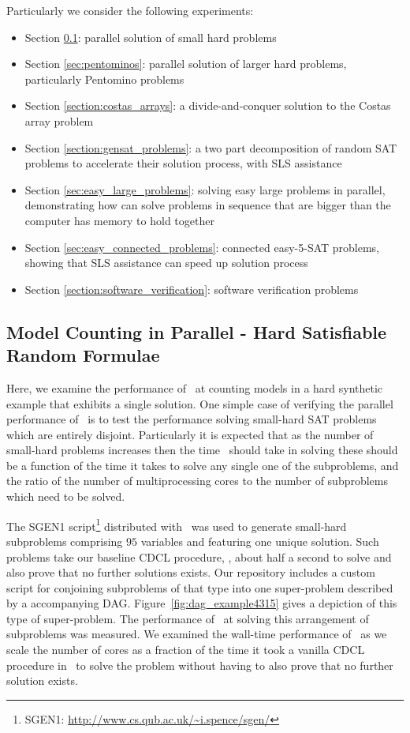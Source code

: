 \documentclass[
10pt, %
a4paper, %
oneside, %
headinclude,footinclude, %
BCOR5mm, %
]{scrartcl}
\begin{document}
Particularly we consider the following experiments:

\begin{itemize}
\item	Section \ref{section:section1}: parallel solution of small hard problems
\item	Section \ref{sec:pentominos}: parallel solution of larger hard problems, particularly Pentomino problems
\item	Section \ref{section:costas_arrays}: a divide-and-conquer solution to the Costas array problem
\item	Section \ref{section:gensat_problems}: a two part decomposition of random SAT problems to accelerate their solution process, with SLS assistance
\item	Section \ref{sec:easy_large_problems}: solving easy large problems in parallel, demonstrating how \dagster can solve problems in sequence that are bigger than the computer has memory to hold together
\item	Section \ref{sec:easy_connected_problems}: connected easy-5-SAT problems, showing that SLS assistance can speed up solution process
\item	Section \ref{section:software_verification}: software verification problems
\end{itemize}



\subsection{Model Counting in Parallel - Hard Satisfiable Random Formulae}\label{section:section1}

Here, we examine the performance of \dagster\ at counting models in a hard synthetic example that exhibits a single solution.
One simple case of verifying the parallel performance of \dagster\ is to test the performance solving small-hard SAT problems which are entirely disjoint.
Particularly it is expected that as the number of small-hard problems increases then the time \dagster\ should take in solving these should be a function of the time it takes to solve any single one of the subproblems, and the ratio of the number of multiprocessing cores to the number of subproblems which need to be solved.

The SGEN1 script\cite{10.1145/1671970.1671972}\footnote{SGEN1: \url{http://www.cs.qub.ac.uk/~i.spence/sgen/}} distributed with \dagster\ was used to generate small-hard subproblems comprising $95$ variables and featuring one unique solution.
Such problems take our baseline CDCL procedure, \tinisat, about half a second to solve and also prove that no further solutions exists.
Our repository includes a custom script for conjoining subproblems of that type into one super-problem described by a accompanying DAG.
Figure~\ref{fig:dag_example4315} gives a depiction of this type of super-problem.
The performance of \dagster\ at solving this arrangement of subproblems was measured.
We examined the wall-time performance of \dagster\ as we scale the number of cores as a fraction of the time it took a vanilla CDCL procedure in \tinisat\ to solve the problem without having to also prove that no further solution exists.
\end{document}
